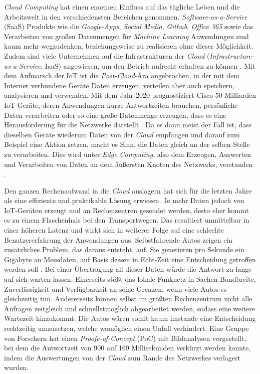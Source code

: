 \textit{Cloud Computing} hat einen enormen Einfluss auf das tägliche Leben und die Arbeitswelt in den verschiedensten Bereichen genommen. \textit{Software-as-a-Service} (SaaS) Produkte wie die \textit{Google-Apps}, \textit{Social Media}, \textit{Github}, \textit{Office 365} sowie das Verarbeiten von großen Datenmengen für \textit{Machine Learning} Anwendungen sind kaum mehr wegzudenken, beziehungsweise zu realisieren ohne dieser Möglichkeit. Zudem sind viele Unternehmen auf die Infrastrukturen der \textit{Cloud} (\textit{Infrastructure-as-a-Service}, IaaS) angewiesen, um den Betrieb aufrecht erhalten zu können \cite{Shi2016}. Mit dem Aufmarsch der IoT ist die \textit{Post-Cloud}-Ära angebrochen, in der mit dem Internet verbundene Geräte Daten erzeugen, verteilen aber auch speichern, analysieren und verwenden. Mit dem Jahr 2020 prognostiziert Cisco 50 Milliarden IoT-Geräte, deren Anwendungen kurze Antwortzeiten brauchen, persönliche Daten verarbeiten oder so eine große Datenmenge erzeugen, dass es eine Herausforderung für die Netzwerke darstellt \cite{Evans2011HowTN}. Da es dann meist der Fall ist, dass dieselben Geräte wiederum Daten von der \textit{Cloud} empfangen und darauf zum Beispiel eine Aktion setzen, macht es Sinn, die Daten gleich an der selben Stelle zu verarbeiten. Dies wird unter \textit{Edge Computing}, also dem Erzeugen, Auswerten und Verarbeiten von Daten an dem äußersten Knoten des Netzwerks, verstanden \cite{Shi2016}.

Den ganzen Rechenaufwand in die \textit{Cloud} auslagern hat sich für die letzten Jahre als eine effiziente und praktikable Lösung erwiesen. Je mehr Daten jedoch von IoT-Geräten erzeugt und an Rechenzentren gesendet werden, desto eher kommt es zu einem Flaschenhals bei den Transportwegen. Das resultiert unmittelbar in einer höheren Latenz und wirkt sich in weiterer Folge auf eine schlechte Benutzererfahrung der Anwendungen aus. Selbstfahrende Autos zeigen ein zusätzliches Problem, das daraus entsteht, auf. Sie generieren pro Sekunde ein Gigabyte an Messdaten, auf Basis dessen in Echt-Zeit eine Entscheidung getroffen werden soll \cite{CW13}. Bei einer Übertragung all dieser Daten würde die Antwort zu lange auf sich warten lassen. Einerseits stößt das lokale Funknetz in Sachen Bandbreite, Zuverlässigkeit und Verfügbarkeit an seine Grenzen, wenn viele Autos es gleichzeitig tun. Andererseits können selbst im größten Rechenzentrum nicht alle Anfragen zeitgleich und schnellstmöglich abgearbeitet werden, sodass eine weitere Wartezeit hinzukommt. Die Autos wären somit kaum imstande eine Entscheidung rechtzeitig umzusetzen, welche womöglich einen Unfall verhindert. Eine Gruppe von Forschern \cite{Yi15} hat einen \textit{Proofe-of-Concept} (PoC) mit Bildanalysen vorgestellt, bei dem die Antwortzeit von 900 auf 169 Millisekunden verkürzt werden konnte, indem die Auswertungen von der \textit{Cloud} zum Rande des Netzwerkes verlagert wurden.

